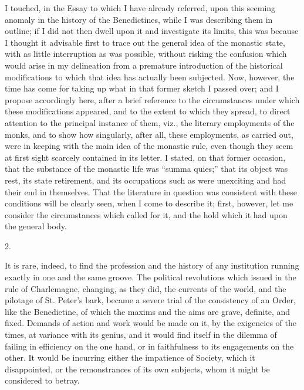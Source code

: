 I touched, in the Essay to which I have already referred, upon this
seeming anomaly in the history of the Benedictines, while I was
describing them in outline; if I did not then dwell upon it and
investigate its limits, this was because I thought it advisable first
to trace out the general idea of the monastic state, with as little
interruption as was possible, without risking the confusion which
would arise in my delineation from a premature introduction of the
historical modifications to which that idea has actually been
subjected. Now, however, the time has come for taking up what in that
former sketch I passed over; and I propose accordingly here, after a
brief reference to the circumstances under which these modifications
appeared, and to the extent to which they spread, to direct attention
to the principal instance of them, viz., the literary employments of
the monks, and to show how singularly, after all, these employments,
as carried out, were in keeping with the main idea of the monastic
rule, even though they seem at first sight scarcely contained in its
letter. I stated, on that former occasion, that the substance of the
monastic life was ``summa quies;'' that its object was rest,
its state retirement, and its occupations such as were unexciting and
had their end in themselves. That the literature in question was
consistent with these conditions will be clearly seen, when I
come to describe it; first, however, let me consider the circumstances
which called for it, and the hold which it had upon the general body.

2.

It is rare, indeed, to find the profession and the history of any
institution running exactly in one and the same groove. The political
revolutions which issued in the rule of Charlemagne, changing, as they
did, the currents of the world, and the pilotage of St. Peter's bark,
became a severe trial of the consistency of an Order, like the
Benedictine, of which the maxims and the aims are grave, definite, and
fixed. Demands of action and work would be made on it, by the
exigencies of the times, at variance with its genius, and it would
find itself in the dilemma of failing in efficiency on the one hand,
or in faithfulness to its engagements on the other. It would be
incurring either the impatience of Society, which it disappointed, or
the remonstrances of its own subjects, whom it might be considered to
betray.

